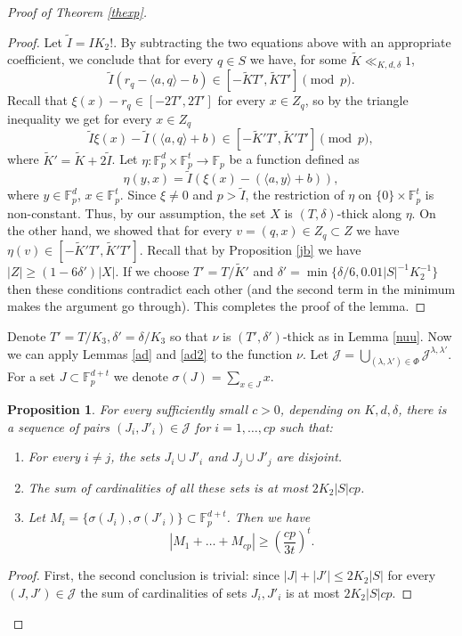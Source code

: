 \documentclass{daj}
\renewcommand{\le}{\leqslant}
\renewcommand{\ge}{\geqslant}
\newcommand{\FF}{\mathbb F}
\newcommand{\J}{\mathcal J}
\newtheorem{prop}[theorem]{Proposition}
\theoremstyle{definition}
\theoremstyle{remark}
\theoremstyle{definition}
\theoremstyle{definition}
\begin{document}
\begin{proof}[Proof of Theorem \ref{thexp}]
\begin{proof}
Let $\tilde I = I K_2!$. By subtracting the two equations above with an appropriate coefficient, we conclude that for every $q\in S$ we have, for some $\tilde K \ll_{K,d,\delta} 1$, 
$$
\tilde I (r_q - \langle a, q \rangle - b) \in [-\tilde K T', \tilde K T'] \pmod p.
$$
Recall that $\xi(x) - r_q \in [-2T', 2T']$ for every $x \in Z_q$, so by the triangle inequality we get for every $x \in Z_q$
$$
\tilde I \xi(x) - \tilde I (\langle a, q\rangle + b) \in [-\tilde K' T', \tilde K' T'] \pmod p,
$$
where $\tilde K' = \tilde K + 2\tilde I$.
Let $\eta: \FF_p^d \times \FF_p^t \rightarrow \FF_p$ be a function defined as
$$
\eta(y, x) = \tilde I (\xi(x) - (\langle a, y\rangle + b)),
$$
where $y \in \FF_p^d$, $x \in \FF_p^t$. Since $\xi \neq 0$ and $p > \tilde I$, the restriction of $\eta$ on $\{0\}\times \FF_p^t$ is non-constant. Thus, by our assumption, the set $X$ is $(T, \delta)$-thick along $\eta$. On the other hand, we showed that for every $v = (q, x) \in Z_q \subset Z$ we have $\eta(v) \in [-\tilde K' T', \tilde K' T']$. Recall that by Proposition \ref{jb} we have $|Z| \ge (1-6\delta') |X|$. If we choose $T' = T/\tilde K'$ and $\delta' = \min \{\delta/6, 0.01 |S|^{-1} K_2^{-1}\}$ then these conditions contradict each other (and the second term in the minimum makes the argument go through). This completes the proof of the lemma.
\end{proof}

Denote $T' = T/K_3, \delta' = \delta/K_3$ so that $\nu$ is $(T', \delta')$-thick as in Lemma \ref{nuu}. 
Now we can apply Lemmas \ref{ad} and \ref{ad2} to the function $\nu$. Let $\J = \bigcup_{(\lambda, \lambda') \in \Phi} \J^{\lambda, \lambda'}$. For a set $J \subset \FF_p^{d+t}$ we denote $\sigma(J) = \sum_{x \in J} x$.
\begin{prop}\label{adp1}
For every sufficiently small $c>0$, depending on $K,d,\delta$, there is a sequence of pairs $(J_i, J'_i) \in \J$ for $i = 1, \ldots, cp$ such that:
\begin{enumerate}
    \item For every $i \neq j$, the sets $J_i \cup J'_i$ and $J_j \cup J'_j$ are disjoint.
    \item The sum of cardinalities of all these sets is at most $2K_2 |S| cp$.
    \item Let $M_i = \{ \sigma(J_i), \sigma(J'_i) \} \subset \FF_p^{d+t}$. Then we have 
\begin{equation}\label{eq3}
    |M_1 + \ldots + M_{cp}| \ge \left(\frac{cp}{3t} \right)^{t}.
\end{equation}
\end{enumerate}
\end{prop}
\begin{proof}
First, the second conclusion is trivial: since $|J|+|J'| \le 2 K_2 |S|$ for every $(J, J') \in \J$ the sum of cardinalities of sets $J_i, J'_i$ is at most $2K_2 |S| cp$. 


\end{proof}
\end{proof}
\end{document}

